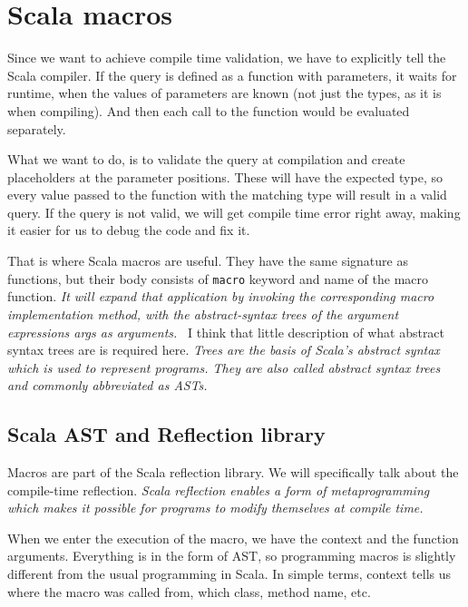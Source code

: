 \section{Scala macros}
Since we want to achieve compile time validation, we have to explicitly tell the Scala compiler. If the query is defined as a function with parameters, it waits for runtime, when the values of parameters are known (not just the types, as it is when compiling). And then each call to the function would be evaluated separately.

What we want to do, is to validate the query at compilation and create placeholders at the parameter positions. These will have the expected type, so every value passed to the function with the matching type will result in a valid query. If the query is not valid, we will get compile time error right away, making it easier for us to debug the code and fix it.

That is where Scala macros are useful. They have the same signature as functions, but their body consists of \texttt{macro} keyword and name of the macro function.  \textit{It will expand that application by invoking the corresponding macro implementation method, with the abstract-syntax trees of the argument expressions args as arguments.}~\cite{Def macros} I think that little description of what abstract syntax trees are is required here. \textit{Trees are the basis of Scala’s abstract syntax which is used to represent programs. They are also called abstract syntax trees and commonly abbreviated as ASTs.}\cite{Trees}

\subsection{Scala AST and Reflection library}
Macros are part of the Scala reflection library. We will specifically talk about the compile-time reflection. \textit{Scala reflection enables a form of metaprogramming which makes it possible for programs to modify themselves at compile time.}\cite{Compile-time reflection} 

When we enter the execution of the macro, we have the context and the function arguments. Everything is in the form of AST, so programming macros is slightly different from the usual programming in Scala. In simple terms, context tells us where the macro was called from, which class, method name, etc. 

